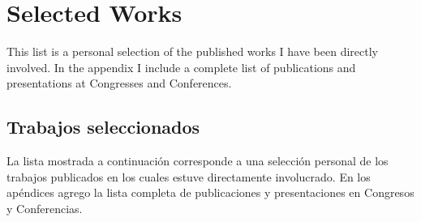 \ifeng
\section*{Selected Works}
\noindent

This list is a personal selection of the published works I have been directly involved.
In the appendix I include a complete list of publications and presentations at Congresses and Conferences.

\else
\subsection*{Trabajos seleccionados}
\noindent

La lista mostrada a continuación corresponde a una selección personal de los trabajos publicados en los cuales estuve directamente involucrado.
En los apéndices agrego la lista completa de publicaciones y presentaciones en Congresos y Conferencias.
\fi

